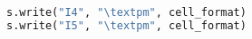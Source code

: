 \documentclass{article}
\begin{document}
\begin{lstlisting}[language=Python]
s.write("I4", "\textpm", cell_format)
s.write("I5", "\textpm", cell_format)
\end{lstlisting}
\end{document}
